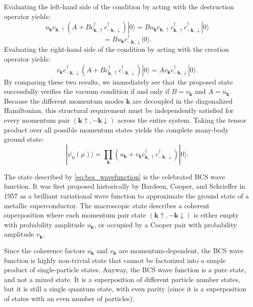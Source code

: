 Evaluating the left-hand side of the condition by acting with the destruction operator yields:
\[
    u_{\mathbf{k}} c_{\mathbf{k},\uparrow} \left( A + B c_{\mathbf{k},\uparrow}^\dagger c_{-\mathbf{k},\downarrow}^\dagger \right) |0\rangle = B u_{\mathbf{k}} c_{\mathbf{k},\uparrow} c_{\mathbf{k},\uparrow}^\dagger c_{-\mathbf{k},\downarrow}^\dagger |0\rangle
\]
\[
    = B u_{\mathbf{k}} c_{-\mathbf{k},\downarrow}^\dagger |0\rangle.
\]
Evaluating the right-hand side of the condition by acting with the creation operator yields:
\[
    v_{\mathbf{k}} c_{-\mathbf{k},\downarrow}^\dagger \left( A + B c_{\mathbf{k},\uparrow}^\dagger c_{-\mathbf{k},\downarrow}^\dagger \right) |0\rangle = A v_{\mathbf{k}} c_{-\mathbf{k},\downarrow}^\dagger |0\rangle.
\]
By comparing these two results, we immediately see that the proposed state successfully verifies the vacuum condition if and only if \( B = v_{\mathbf{k}} \) and \( A = u_{\mathbf{k}} \). Because the different momentum modes \( \mathbf{k} \) are decoupled in the diagonalized Hamiltonian, this structural requirement must be independently satisfied for every momentum pair \( (\mathbf{k}\uparrow, -\mathbf{k}\downarrow) \) across the entire system. Taking the tensor product over all possible momentum states yields the complete many-body ground state:
\begin{equation} \label{eq:bcs_wavefunction}
    |\psi_0(\mu)\rangle = \prod_{\mathbf{k}} \left( u_{\mathbf{k}} + v_{\mathbf{k}} c_{\mathbf{k},\uparrow}^\dagger c_{-\mathbf{k},\downarrow}^\dagger \right) |0\rangle.
\end{equation}

The state described by \eqref{eq:bcs_wavefunction} is the celebrated BCS wave function. It was first proposed historically by Bardeen, Cooper, and Schrieffer in 1957 as a brilliant variational wave function to approximate the ground state of a metallic superconductor. The macroscopic state describes a coherent superposition where each momentum pair state \( (\mathbf{k}\uparrow, -\mathbf{k}\downarrow) \) is either empty with probability amplitude \( u_{\mathbf{k}} \), or occupied by a Cooper pair with probability amplitude \( v_{\mathbf{k}} \).

Since the coherence factors \( u_{\mathbf{k}} \) and \( v_{\mathbf{k}} \) are momentum-dependent, the BCS wave function is highly non-trivial state that cannot be factorized into a simple product of single-particle states. Anyway, the BCS wave function is a pure state, and not a mixed state. It is a superposition of different particle number states, but it is still a single quantum state, with even parity (since it is a superposition of states with an even number of particles).

